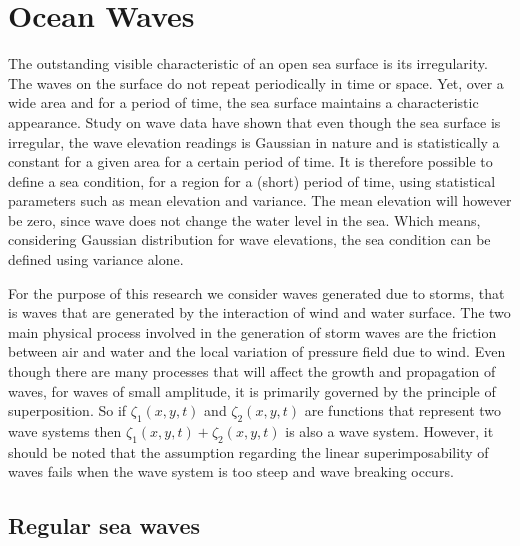\section{Ocean Waves} 

The outstanding visible characteristic of an open sea surface is its
irregularity. The waves on the surface do not repeat periodically in time or
space. Yet, over a wide area and for a period of time, the sea surface maintains
a characteristic appearance. Study on wave data have shown that even though the
sea surface is irregular, the wave elevation readings is Gaussian in nature and
is statistically a constant for a given area for a certain period of time. It is
therefore possible to define a sea condition, for a region for a (short) period
of time, using statistical parameters such as mean elevation and variance. The
mean elevation will however be zero, since wave does not change the water level
in the sea. Which means, considering Gaussian distribution for wave elevations,
the sea condition can be defined using variance alone.

For the purpose of this research we consider waves generated due to storms, that
is waves that are generated by the interaction of wind and water surface. The
two main physical process involved in the generation of storm waves are the
friction between air and water and the local variation of pressure field due to
wind. Even though there are many processes that will affect the growth and
propagation of waves, for waves of small amplitude, it is primarily governed by
the principle of superposition. So if $\zeta_1(x,y,t)$ and $\zeta_2(x,y,t)$ are
functions that represent two wave systems then $\zeta_1(x,y,t) + \zeta_2(x,y,t)$
is also a wave system.  However, it should be noted that the assumption
regarding the linear superimposability of waves fails when the wave system is
too steep and wave breaking occurs.

\subsection{Regular sea waves}

